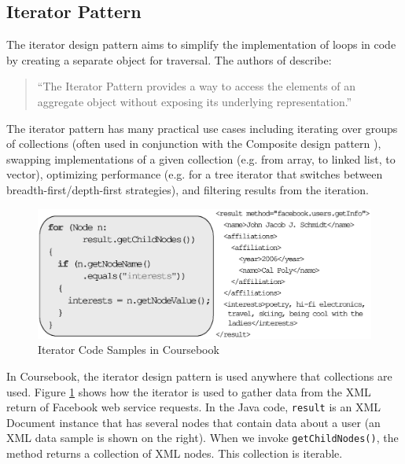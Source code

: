 \subsection{Iterator Pattern}

The iterator design pattern aims to simplify the implementation of loops in code
by creating a separate object for traversal. The authors of \cite{GangOf4}
describe: 

\begin{quote}
``The Iterator Pattern provides a way to access the elements of an aggregate 
object without exposing its underlying representation.'' \cite{GangOf4}
\end{quote}

The iterator pattern has many practical use cases including iterating over
groups of collections (often used in conjunction with the Composite design
pattern \cite{GangOf4}), swapping implementations of a given collection (e.g.
from array, to linked list, to vector), optimizing performance (e.g. for a tree
iterator that switches between breadth-first/depth-first strategies), and
filtering results from the iteration.

\begin{figure}[t]
  \begin{center}
  \includegraphics[width=\textwidth]{images/iterator}
  \caption{Iterator Code Samples in Coursebook}
  \label{fig:iterator}
  \end{center}
\end{figure}

In Coursebook, the iterator design pattern is used anywhere that collections are
used. Figure \ref{fig:iterator} shows how the iterator is used to gather data
from the XML return of Facebook web service requests. In the Java code,
\verb!result! is an XML Document instance that has several nodes that contain
data about a user (an XML data sample is shown on the right). When we invoke
\verb!getChildNodes()!, the method returns a collection of XML nodes. This
collection is iterable.

